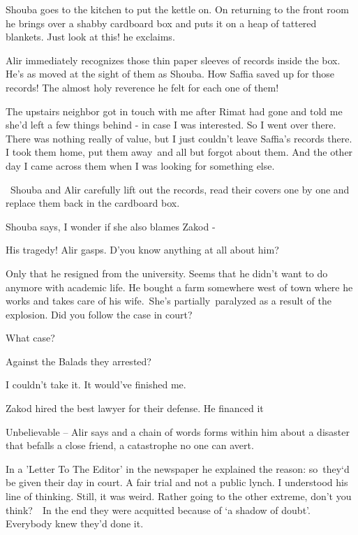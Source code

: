 \documentclass[letterpaper]{article}
\begin{document}
Shouba goes to the kitchen to put the kettle on. On returning to the front room he brings over a shabby cardboard box
and puts it on a heap of tattered blankets. {\textquotedbl}Just look at this!{\textquotedbl} he exclaims.

Alir immediately recognizes those thin paper sleeves of records inside the box. He's as moved at the sight of them as
Shouba. {\textquotedbl}How Saffia saved up for those records! The almost holy reverence he felt for each one of
them!{\textquotedbl} 

{\textquotedbl}The upstairs neighbor got in touch with me after Rimat had gone and told me she'd left a few things
behind - in case I was interested. So I went over there. There was nothing really of value, but I just couldn't leave
Saffia's records there. I took them home, put them away~and all but forgot about them. And the other day I came across
them when I was looking for something else.{\textquotedbl}

~Shouba and Alir carefully lift out the records, read their covers one by one and replace them back in the cardboard
box. 

Shouba says, {\textquotedbl}I wonder if she also blames Zakod -{\textquotedbl} 

{\textquotedbl}His tragedy!{\textquotedbl} Alir gasps. {\textquotedbl}D'you know anything at all about
him?{\textquotedbl} 

{\textquotedbl}Only that he resigned from the university. Seems that he didn't want to do anymore with academic life. He
bought a farm somewhere west of town where he works and takes care of his wife.\ She's partially\ paralyzed as a result
of the explosion. Did you follow the case in court?{\textquotedbl} 

{\textquotedbl}What case?{\textquotedbl} 

{\textquotedbl}Against the Balads they arrested?{\textquotedbl} 

{\textquotedbl}I couldn't take it. It would've finished me.{\textquotedbl} 

{\textquotedbl}Zakod hired the best lawyer for their defense. He financed it

{\textquotedbl}Unbelievable --{\textquotedbl} Alir says and a chain of words forms within him about a disaster that
befalls a close friend, a catastrophe no one can avert.

{\textquotedbl}In a {}'Letter To The Editor{}' in the newspaper he explained the reason: so\ they`d be given their day
in court. A fair trial and not a public lynch. I understood his line of thinking. Still, it was weird. Rather going to
the other extreme, don't you think?\textcolor[rgb]{0.0,0.6901961,0.3137255}{\ \ }In the end they were acquitted because
of `a shadow of doubt'. Everybody knew they'd done it.{\textquotedbl}
\end{document}
